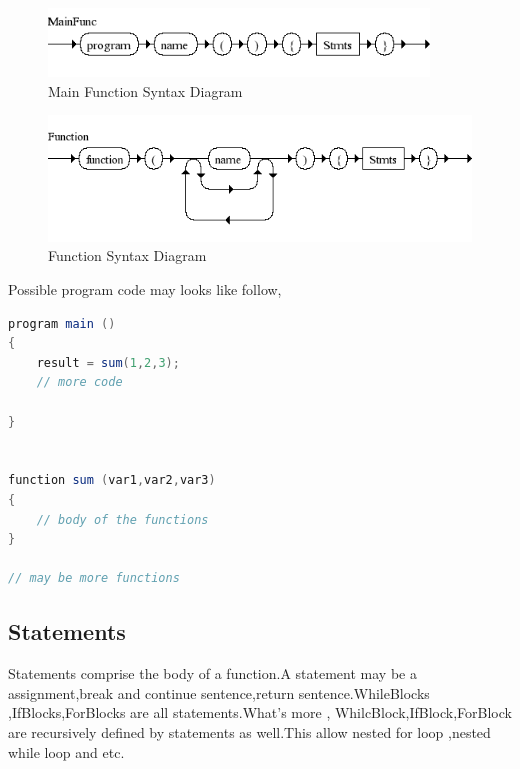 \begin{figure}[h!]
  \centering
	\includegraphics[width=0.90\textwidth]{pic/c4/main_function.png}
	\caption{Main Function Syntax Diagram}
\end{figure}

\begin{figure}[h!]
  \centering
	\includegraphics[width=1.00\textwidth]{pic/c4/function.png}
	\caption{Function Syntax Diagram}
\end{figure}


Possible program code may looks like follow,

\begin{lstlisting}[language=java]
program main ()
{
 	result = sum(1,2,3);
 	// more code
 	
}


function sum (var1,var2,var3)
{
	// body of the functions
}

// may be more functions
\end{lstlisting}


\subsection{Statements}
Statements  comprise the body of a function.A statement may be a assignment,break and continue sentence,return sentence.WhileBlocks ,IfBlocks,ForBlocks are all statements.What's more , WhilcBlock,IfBlock,ForBlock are recursively defined by statements as well.This allow nested for loop ,nested while loop and etc.

